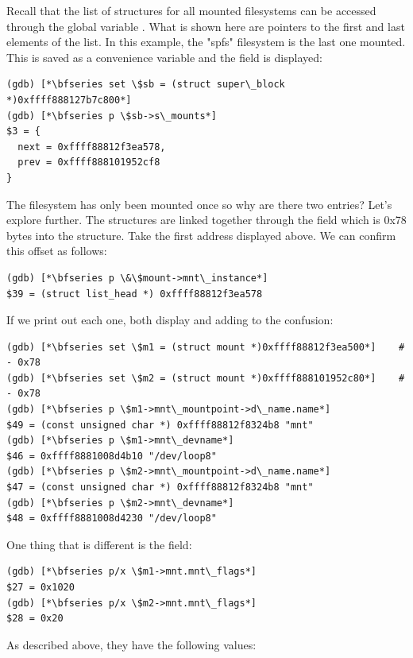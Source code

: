 \noindent
Recall that the list of  structures for all mounted filesystems can be accessed through the global variable . What is shown here are pointers to the first and last elements of the list. In this example, the "spfs" filesystem is  the last one mounted. This is saved as a convenience variable and the  field is displayed:

\begin{lstlisting}
(gdb) [*\bfseries set \$sb = (struct super\_block *)0xffff888127b7c800*]
(gdb) [*\bfseries p \$sb->s\_mounts*]
$3 = {
  next = 0xffff88812f3ea578,
  prev = 0xffff888101952cf8
}
\end{lstlisting}

\noindent
The filesystem has only been mounted once so why are there two entries? Let's explore further. The  structures are linked together through the  field which is 0x78 bytes into the  structure. Take the first address displayed above. We can confirm this offset as follows:

\begin{lstlisting}
(gdb) [*\bfseries p \&\$mount->mnt\_instance*]
$39 = (struct list_head *) 0xffff88812f3ea578
\end{lstlisting}

\noindent
If we print out each one, both display  and  adding to the confusion:

\begin{lstlisting}
(gdb) [*\bfseries set \$m1 = (struct mount *)0xffff88812f3ea500*]    # - 0x78
(gdb) [*\bfseries set \$m2 = (struct mount *)0xffff888101952c80*]    # - 0x78
(gdb) [*\bfseries p \$m1->mnt\_mountpoint->d\_name.name*]
$49 = (const unsigned char *) 0xffff88812f8324b8 "mnt"
(gdb) [*\bfseries p \$m1->mnt\_devname*]
$46 = 0xffff8881008d4b10 "/dev/loop8"
(gdb) [*\bfseries p \$m2->mnt\_mountpoint->d\_name.name*]
$47 = (const unsigned char *) 0xffff88812f8324b8 "mnt"
(gdb) [*\bfseries p \$m2->mnt\_devname*]
$48 = 0xffff8881008d4230 "/dev/loop8"
\end{lstlisting}

\noindent
One thing that is different is the  field:

\begin{lstlisting}
(gdb) [*\bfseries p/x \$m1->mnt.mnt\_flags*]
$27 = 0x1020
(gdb) [*\bfseries p/x \$m2->mnt.mnt\_flags*]
$28 = 0x20
\end{lstlisting}

\noindent
As described above, they have the following values:

